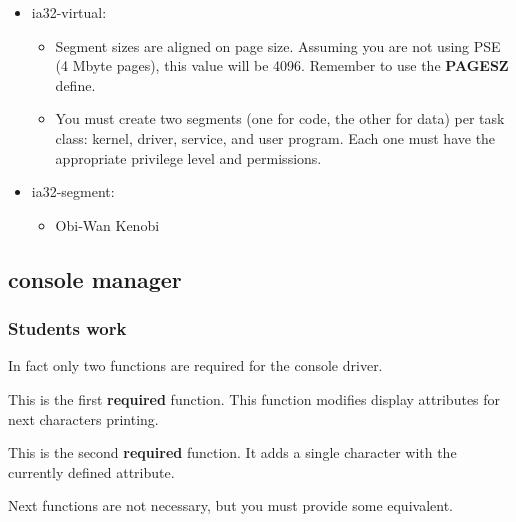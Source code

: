 \begin{itemize}

\item ia32-virtual:
\begin{itemize}

\item Segment  sizes are  aligned on page  size. Assuming you  are not
using PSE  (4 Mbyte pages), this  value will be 4096.  Remember to use
the \textbf{PAGESZ} define.

\item You must create two segments  (one for code, the other for data)
per task class:  kernel, driver, service, and user  program.  Each one
must have the appropriate privilege level and permissions.

\end{itemize}

\item ia32-segment:
\begin{itemize}

\item Obi-Wan Kenobi

\end{itemize}
\end{itemize}

%
%

\subsection{console manager}

\subsubsection{Students work}

In fact only two functions are required for the console driver.


This is  the first \textbf{required} function.  This function modifies
display attributes for next characters printing.


This  is  the second  \textbf{required}  function.  It  adds a  single
character with the currently defined attribute.

Next  functions   are  not  necessary,  but  you   must  provide  some
equivalent.


